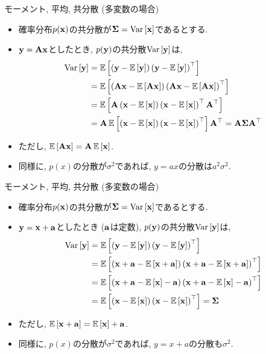 \documentclass[dvipdfmx,notheorems,t]{beamer}
\begin{document}
\begin{frame}{モーメント, 平均, 共分散 (多変数の場合)}
\begin{itemize}
  \item 確率分布$p(\vb{x})$の共分散が$\vb{\Sigma} = \Var{\vb{x}}$であるとする.
  \item $\vb{y} = \vb{A} \vb{x}$としたとき, $p(\vb{y})$の共分散$\Var{\vb{y}}$は,
  \begin{align*}
    \Var{\vb{y}}
    &= \E{\left( \vb{y} - \E{\vb{y}} \right) \left( \vb{y} - \E{\vb{y}} \right)^\top} \\
    &= \E{\left( \vb{A} \vb{x} - \E{\vb{A} \vb{x}} \right)
      \left( \vb{A} \vb{x} - \E{\vb{A} \vb{x}} \right)^\top} \\
    &= \E{\vb{A} \left( \vb{x} - \E{\vb{x}} \right) \left( \vb{x} - \E{\vb{x}} \right)^\top \vb{A}^\top} \\
    &= \vb{A} \E{\left( \vb{x} - \E{\vb{x}} \right) \left( \vb{x} - \E{\vb{x}} \right)^\top} \vb{A}^\top
    = \vb{A} \vb{\Sigma} \vb{A}^\top
  \end{align*}
  \item ただし, $\E{\vb{A} \vb{x}} = \vb{A} \E{\vb{x}}$.
  \item 同様に, $p(x)$の分散が$\sigma^2$であれば, $y = ax$の分散は$a^2 \sigma^2$.
\end{itemize}
\end{frame}

\begin{frame}{モーメント, 平均, 共分散 (多変数の場合)}
\begin{itemize}
  \item 確率分布$p(\vb{x})$の共分散が$\vb{\Sigma} = \Var{\vb{x}}$であるとする.
  \item $\vb{y} = \vb{x} + \vb{a}$としたとき ($\vb{a}$は定数), $p(\vb{y})$の共分散$\Var{\vb{y}}$は,
  \begin{align*}
    \Var{\vb{y}}
    &= \E{\left( \vb{y} - \E{\vb{y}} \right) \left( \vb{y} - \E{\vb{y}} \right)^\top} \\
    &= \E{\left( \vb{x} + \vb{a} - \E{\vb{x} + \vb{a}} \right)
      \left( \vb{x} + \vb{a} - \E{\vb{x} + \vb{a}} \right)^\top} \\
    &= \E{\left( \vb{x} + \vb{a} - \E{\vb{x}} - \vb{a} \right)
      \left( \vb{x} + \vb{a} - \E{\vb{x}} - \vb{a} \right)^\top} \\
    &= \E{\left( \vb{x} - \E{\vb{x}} \right) \left( \vb{x} - \E{\vb{x}} \right)^\top} = \vb{\Sigma}
  \end{align*}
  \item ただし, $\E{\vb{x} + \vb{a}} = \E{\vb{x}} + \vb{a}$.
  \item 同様に, $p(x)$の分散が$\sigma^2$であれば, $y = x + a$の分散も$\sigma^2$.
\end{itemize}
\end{frame}
\end{document}
